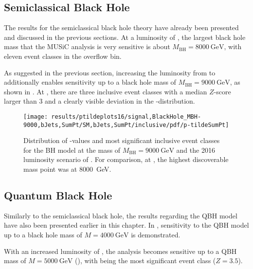 \subsection{Semiclassical Black Hole}
\label{sec:results_bh}

The results for the semiclassical black hole theory have already been presented and discussed in the previous sections. At a luminosity of \lumiA, the largest black hole mass that the \ac{MUSiC} analysis is very sensitive is about $M_\text{BH} = \SI{8000}{\GeV}$, with eleven event classes in the overflow bin.

As suggested in the previous section, increasing the luminosity from \lumiA to \lumiB additionally enables sensitivity up to a black hole mass of $M_\text{BH} = \SI{9000}{\GeV}$, as shown in . At \lumiB, there are three inclusive event classes with a median $Z$-score larger than \num{3} and a clearly visible deviation in the \ptilde-distribution.

\begin{figure}[p]
    \centering
    \texttt{[image: results/ptildeplots16/signal,BlackHole\_MBH-9000,bJets,SumPt/SM,bJets,SumPt/inclusive/pdf/p-tildeSumPt]}
    {
        \setlength{\tabcolsep}{1em}
        
    }
    \caption{Distribution of \ptilde-values and most significant inclusive event classes for the \acf{BH} model at the mass of $M_\text{BH} = \SI{9000}{\GeV}$ and the 2016 luminosity scenario of \lumiB. For comparison, at \lumiA, the highest discoverable mass point was at \SI{8000}{\GeV}.}
    \label{fig:result_bh_9000}
\end{figure}

\subsection{Quantum Black Hole}
\label{sec:results_qbh}

Similarly to the semiclassical black hole, the results regarding the \ac{QBH} model have also been presented earlier in this chapter. In , sensitivity to the \ac{QBH} model up to a black hole mass of $M = \SI{4000}{\GeV}$ is demonstrated.

With an increased luminosity of \lumiB, the analysis becomes sensitive up to a \ac{QBH} mass of  $M = \SI{5000}{\GeV}$ (), with  being the most significant event class ($Z = \num{3.5}$).

